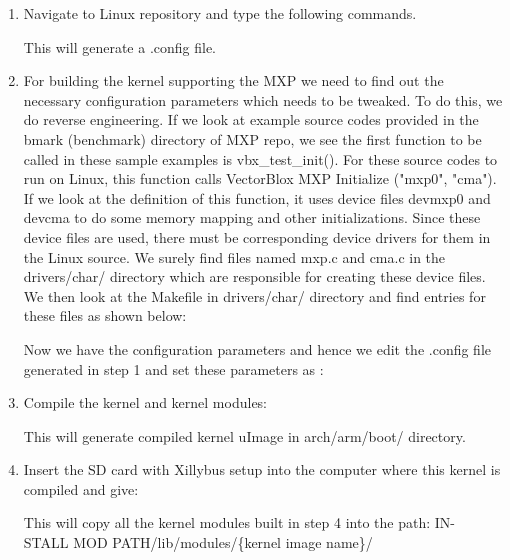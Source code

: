 \begin{enumerate}
	\item Navigate to Linux repository and type the following commands.
	
	
	
	This will generate a .config file.
	
	\item For building the kernel supporting the MXP we need to find out the necessary configuration parameters which needs to be tweaked. To do this, we do reverse engineering. If we look at example source codes provided in the bmark (benchmark) directory of MXP repo, we see the first function to be called in these sample examples is vbx\_test\_init(). For these source codes to run on Linux, this function calls VectorBlox MXP Initialize ("mxp0", "cma"). If we look at the definition of this function, it uses device files \/dev\/mxp0 and \/dev\/cma to do some memory mapping and other initializations. Since these device files are used, there must be corresponding device drivers for them in the Linux source. We surely find files named mxp.c and cma.c in the drivers/char/ directory which are responsible for creating these device files. We then look at the Makefile in drivers/char/ directory and find entries for these files as shown below:
	
	
	
	Now we have the configuration parameters and hence we edit the .config file generated in step 1 and set these parameters as :
	
	
	
	\item Compile the kernel and kernel modules:
	
	
	This will generate compiled kernel uImage in arch/arm/boot/ directory.
	
	\item Insert the SD card with Xillybus setup into the computer where this kernel is compiled and give:
	
		
		
	This will copy all the kernel modules built in step 4 into the path: IN-
	STALL MOD PATH/lib/modules/\{kernel image name\}/
	
\end{enumerate}

